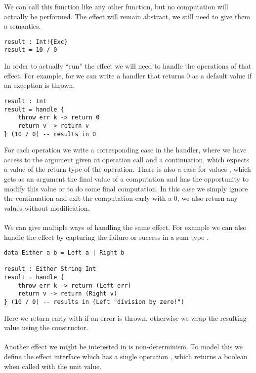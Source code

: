 {We can call this function like any other function, but no computation will actually be performed.
The effect will remain abstract, we still need to give them a semantics.

\begin{verbatim}
result : Int!{Exc}
result = 10 / 0
\end{verbatim}

In order to actually ``run'' the effect we will need to handle the operations of that effect.
For example, for  we can write a handler that returns $0$ as a default value if an exception is thrown.

\begin{verbatim}
result : Int
result = handle {
	throw err k -> return 0
	return v -> return v
} (10 / 0) -- results in 0
\end{verbatim}

For each operation we write a corresponding case in the handler, where we have access to the argument given at operation call and a continuation, which expects a value of the return type of the operation.
There is also a case for values , which gets as an argument the final value of a computation and has the opportunity to modify this value or to do some final computation.
In this case we simply ignore the continuation and exit the computation early with a $0$, we also return any values without modification.
\\\\
We can give multiple ways of handling the same effect.
For example we can also handle the  effect by capturing the failure or success in a sum type .

\begin{verbatim}
data Either a b = Left a | Right b

result : Either String Int
result = handle {
	throw err k -> return (Left err)
	return v -> return (Right v)
} (10 / 0) -- results in (Left "division by zero!")
\end{verbatim}

Here we return early with  if an error is thrown, otherwise we wrap the resulting value using the  constructor.
\\\\
Another effect we might be interested in is non-determinism.
To model this we define the  effect interface which has a single operation , which returns a boolean when called with the unit value.

}
